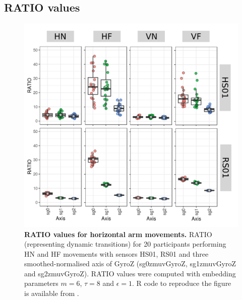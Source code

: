 \subsection{RATIO values}
\begin{figure}
\centering
\includegraphics[width=1.0\textwidth]{ratio-bp}
    \caption{
	{\bf RATIO values for horizontal arm movements.}
	RATIO (representing dynamic transitions) for 
	20 participants performing HN and HF movements
	with sensors HS01, RS01 and three smoothed-normalised axis 
	of GyroZ (sg0zmuvGyroZ, sg1zmuvGyroZ and sg2zmuvGyroZ).
	RATIO values were computed with 
	embedding parameters $m=6$, $\tau=8$ and $\epsilon=1$.
	R code to reproduce the figure is available from \cite{hwum2018}.
        }
    \label{fig:ratio_aH}
\end{figure}



\newpage

